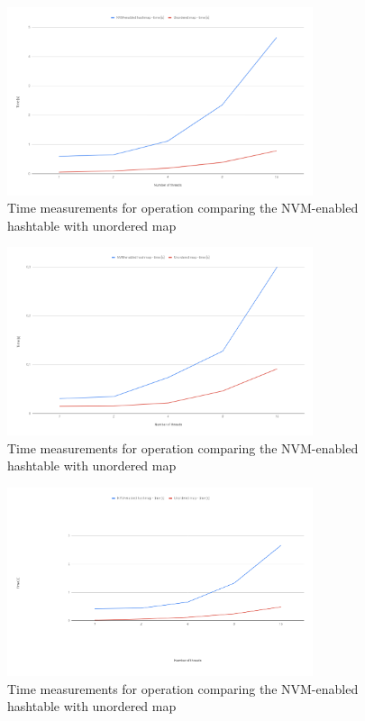\begin{figure}[ht]
    \centering
    \includegraphics[width=0.8\textwidth]{thesis/figures/insert.png}
    \caption{Time measurements for \insertMethod operation comparing the NVM-enabled hashtable with unordered map}
    \label{insertPlot}
\end{figure}

\begin{figure}[ht]
    \centering
    \includegraphics[width=0.8\textwidth]{thesis/figures/get.png}
    \caption{Time measurements for \getMethod operation comparing the NVM-enabled hashtable with unordered map}
    \label{getPlot}
\end{figure}

\begin{figure}[ht]
    \centering
    \includegraphics[width=0.8\textwidth]{thesis/figures/remove.png}
    \caption{Time measurements for \removeMethod operation comparing the NVM-enabled hashtable with unordered map}
    \label{removePlot}
\end{figure}

